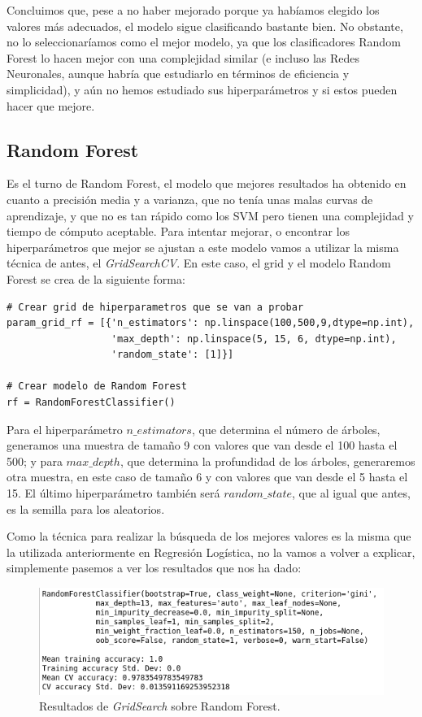 \documentclass[11pt,a4paper]{article}
\begin{document}
Concluimos que, pese a no haber mejorado porque ya habíamos elegido los valores más adecuados, el modelo sigue clasificando bastante bien. No obstante, no lo seleccionaríamos como el mejor modelo, ya que los clasificadores Random Forest lo hacen mejor con una complejidad similar (e incluso las Redes Neuronales, aunque habría que estudiarlo en términos de eficiencia y simplicidad), y aún no hemos estudiado sus hiperparámetros y si estos pueden hacer que mejore.

\subsection{Random Forest}

Es el turno de Random Forest, el modelo que mejores resultados ha obtenido en cuanto a precisión media y a varianza, que no tenía unas malas curvas de aprendizaje, y que no es tan rápido como los SVM pero tienen una complejidad y tiempo de cómputo aceptable. Para intentar mejorar, o encontrar los hiperparámetros que mejor se ajustan a este modelo vamos a utilizar la misma técnica de antes, el \textit{GridSearchCV}. En este caso, el grid y el modelo Random Forest se crea de la siguiente forma:

\begin{lstlisting}
# Crear grid de hiperparametros que se van a probar
param_grid_rf = [{'n_estimators': np.linspace(100,500,9,dtype=np.int),
                  'max_depth': np.linspace(5, 15, 6, dtype=np.int),
                  'random_state': [1]}]

# Crear modelo de Random Forest
rf = RandomForestClassifier()

\end{lstlisting}

Para el hiperparámetro $n\_estimators$, que determina el número de árboles, generamos una muestra de tamaño 9 con valores que van desde el 100 hasta el 500; y para $max\_depth$, que determina la profundidad de los árboles, generaremos otra muestra, en este caso de tamaño 6 y con valores que van desde el 5 hasta el 15. El último hiperparámetro también será $random\_state$, que al igual que antes, es la semilla para los aleatorios.

Como la técnica para realizar la búsqueda de los mejores valores es la misma que la utilizada anteriormente en Regresión Logística, no la vamos a volver a explicar, simplemente pasemos a ver los resultados que nos ha dado:

\begin{figure}[H]
    \centering
    \includegraphics[scale=0.6]{img/gs-rf.png}
    \caption{Resultados de \textit{GridSearch} sobre Random Forest.}
    \label{fig:gs-lr}
\end{figure}
\end{document}
